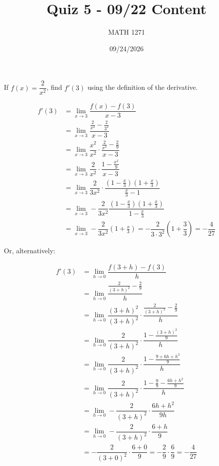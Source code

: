 \documentclass[addpoints,12pt]{exam}
\title{\vspace{-0.5in} Quiz 5 - 09/22 Content}
\date{09/24/2026}
\author{MATH 1271}
\begin{document}
  \NameSection
  {\let\newpage\relax\maketitle}

  \PointsSection

  \newpage
  \begin{questions}
    \question[5] If $f(x) = \dfrac{2}{x^2}$, find $f'(3)$ using the definition of the derivative.
    \begin{solution}
      \begin{align}
        f'(3) &= \lim\limits_{x \rightarrow 3} \dfrac{f(x) - f(3)}{ x-3} \\
              &= \lim\limits_{x \rightarrow 3} \dfrac{\frac{2}{x^2} - \frac{2}{3^2}}{x - 3} \\
              &= \lim\limits_{x \rightarrow 3} \dfrac{x^2}{x^2} \cdot \dfrac{\frac{2}{x^2} - \frac{2}{9}}{x - 3} \\
              &= \lim\limits_{x \rightarrow 3} \dfrac{2}{x^2} \cdot \dfrac{1 - \frac{x^2}{9}}{x - 3} \\
              &= \lim\limits_{x \rightarrow 3} \dfrac{2}{3x^2} \cdot \dfrac{(1 - \frac{x}{3})(1 + \frac{x}{3})}{\frac{x}{3} - 1} \\
              &= \lim\limits_{x \rightarrow 3} -\dfrac{2}{3x^2} \dfrac{(1 - \frac{x}{3})(1 + \frac{x}{3})}{1 - \frac{x}{3}} \\
              &= \lim\limits_{x \rightarrow 3} - \dfrac{2}{3x^2} (1 + \frac{x}{3}) = -\dfrac{2}{3\cdot 3^2} (1 + \dfrac{3}{3}) = - \dfrac{4}{27}
      \end{align}

      Or, alternatively:

      \begin{align}
        f'(3) &= \lim\limits_{h \rightarrow 0} \dfrac{f(3 + h) - f(3)}{h} \\
              &= \lim\limits_{h \rightarrow 0} \dfrac{\frac{2}{(3+h)^2} - \frac{2}{9}}{h} \\
              &= \lim\limits_{h \rightarrow 0} \dfrac{(3 + h)^2}{(3 + h)^2} \cdot \dfrac{\frac{2}{(3+h)^2} - \frac{2}{9}}{h} \\
              &= \lim\limits_{h \rightarrow 0} \dfrac{2}{(3 + h)^2} \cdot \dfrac{1 - \frac{(3+h)^2}{9}}{h} \\
              &= \lim\limits_{h \rightarrow 0} \dfrac{2}{(3 + h)^2} \cdot \dfrac{1 - \frac{9 + 6h + h^2}{9}}{h} \\
              &= \lim\limits_{h \rightarrow 0} \dfrac{2}{(3+h)^2} \cdot \dfrac{1 - \frac{9}{9} - \frac{6h + h^2}{9}}{h} \\
              &= \lim\limits_{h \rightarrow 0} -\dfrac{2}{(3 + h)^2} \cdot \dfrac{6h + h^2}{9h} \\
              &= \lim\limits_{h \rightarrow 0} -\dfrac{2}{(3 + h)^2} \cdot \dfrac{6 + h}{9} \\
              &= -\dfrac{2}{(3 + 0)^2} \cdot \dfrac{6 + 0}{9} = -\dfrac{2}{9} \cdot \dfrac{6}{9} = -\dfrac{4}{27}
      \end{align}
    \end{solution}
  \end{questions}
\end{document}

